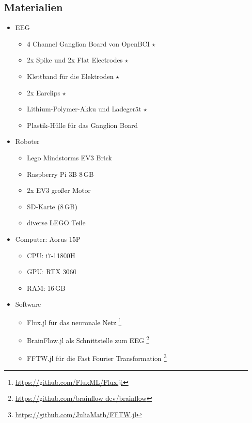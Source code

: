 \documentclass{scrartcl}
\begin{document}
	\subsection{Materialien} \label{Materialien}

	\begin{itemize}
		\item EEG
		\begin{itemize}
			\item 4 Channel Ganglion Board von OpenBCI $\star$
			\item 2x Spike und 2x Flat Electrodes  $\star$
			\item Klettband für die Elektroden $\star$
			\item 2x Earclips $\star$
			\item Lithium-Polymer-Akku und Ladegerät $\star$
			\item Plastik-Hülle für das Ganglion Board
		\end{itemize}
		\item Roboter
		\begin{itemize}
			\item Lego Mindstorms EV3 Brick
			\item Raspberry Pi 3B 8\,GB
			\item 2x EV3 großer Motor
			\item SD-Karte (8\,GB)
			\item diverse LEGO Teile
		\end{itemize}

		\item Computer: Aorus 15P
		\begin{itemize}
			\item CPU: i7-11800H
			\item GPU: RTX 3060
			\item RAM: 16\,GB
		\end{itemize}

		\item Software
		\begin{itemize}
			\item Flux.jl für das neuronale Netz
				\footnote{\href{https://github.com/FluxML/Flux.jl}{https://github.com/FluxML/Flux.jl}}
				\cite{Flux.jl-2018}
				\cite{innes:2018}
			
			\item BrainFlow.jl als Schnittstelle zum EEG
				\footnote{\href{https://github.com/brainflow-dev/brainflow}{https://github.com/brainflow-dev/brainflow}}
				\cite{brainflow}
			
			\item FFTW.jl für die Fast Fourier Transformation
				\footnote{\href{https://github.com/JuliaMath/FFTW.jl}{https://github.com/JuliaMath/FFTW.jl}}
				\cite{FFTW.jl-2005}
			

\end{itemize}
\end{itemize}
\end{document}
